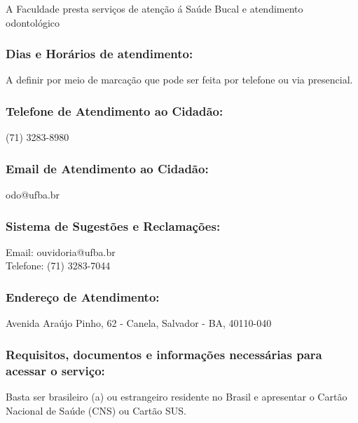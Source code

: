     A Faculdade presta serviços de atenção á Saúde Bucal e atendimento odontológico
        
    \subsubsection{Dias e Horários de atendimento:}
    A definir por meio de marcação que pode ser feita por telefone ou via presencial.
    
    \subsubsection{Telefone de Atendimento ao Cidadão:}
         (71) 3283-8980
        
    \subsubsection{Email de Atendimento ao Cidadão:}
        odo@ufba.br
        
    \subsubsection{Sistema de Sugestões e Reclamações:}
        Email: ouvidoria@ufba.br \\ Telefone: (71) 3283-7044
        
    \subsubsection{Endereço de Atendimento:}
         Avenida Araújo Pinho, 62 - Canela, Salvador - BA, 40110-040
         
    \subsubsection{Requisitos, documentos e informações necessárias para acessar o serviço:}
        Basta ser brasileiro (a) ou estrangeiro residente no Brasil e apresentar o Cartão Nacional de Saúde (CNS) ou Cartão SUS. 

    
